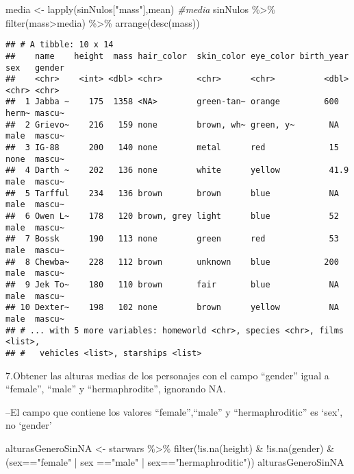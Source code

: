 \documentclass[
]{book}
\newenvironment{Shaded}{\begin{snugshade}}{\end{snugshade}}
\newcommand{\CommentTok}[1]{\textcolor[rgb]{0.56,0.35,0.01}{\textit{#1}}}
\newcommand{\FunctionTok}[1]{\textcolor[rgb]{0.00,0.00,0.00}{#1}}
\newcommand{\NormalTok}[1]{#1}
\newcommand{\OtherTok}[1]{\textcolor[rgb]{0.56,0.35,0.01}{#1}}
\newcommand{\SpecialCharTok}[1]{\textcolor[rgb]{0.00,0.00,0.00}{#1}}
\newcommand{\StringTok}[1]{\textcolor[rgb]{0.31,0.60,0.02}{#1}}
\begin{document}
\begin{Shaded}
\begin{Highlighting}[]
\NormalTok{media }\OtherTok{\textless{}{-}} \FunctionTok{lapply}\NormalTok{(sinNulos[}\StringTok{"mass"}\NormalTok{],mean)}
\CommentTok{\#media}
\NormalTok{sinNulos }\SpecialCharTok{\%\textgreater{}\%} \FunctionTok{filter}\NormalTok{(mass}\SpecialCharTok{\textgreater{}}\NormalTok{media) }\SpecialCharTok{\%\textgreater{}\%} \FunctionTok{arrange}\NormalTok{(}\FunctionTok{desc}\NormalTok{(mass))}
\end{Highlighting}
\end{Shaded}

\begin{verbatim}
## # A tibble: 10 x 14
##    name    height  mass hair_color  skin_color eye_color birth_year sex   gender
##    <chr>    <int> <dbl> <chr>       <chr>      <chr>          <dbl> <chr> <chr> 
##  1 Jabba ~    175  1358 <NA>        green-tan~ orange         600   herm~ mascu~
##  2 Grievo~    216   159 none        brown, wh~ green, y~       NA   male  mascu~
##  3 IG-88      200   140 none        metal      red             15   none  mascu~
##  4 Darth ~    202   136 none        white      yellow          41.9 male  mascu~
##  5 Tarfful    234   136 brown       brown      blue            NA   male  mascu~
##  6 Owen L~    178   120 brown, grey light      blue            52   male  mascu~
##  7 Bossk      190   113 none        green      red             53   male  mascu~
##  8 Chewba~    228   112 brown       unknown    blue           200   male  mascu~
##  9 Jek To~    180   110 brown       fair       blue            NA   male  mascu~
## 10 Dexter~    198   102 none        brown      yellow          NA   male  mascu~
## # ... with 5 more variables: homeworld <chr>, species <chr>, films <list>,
## #   vehicles <list>, starships <list>
\end{verbatim}

7.Obtener las alturas medias de los personajes con el campo ``gender'' igual a ``female'', ``male'' y ``hermaphrodite'', ignorando NA.

--El campo que contiene los valores ``female'',``male'' y ``hermaphroditic'' es `sex', no `gender'

\begin{Shaded}
\begin{Highlighting}[]
\NormalTok{alturasGeneroSinNA }\OtherTok{\textless{}{-}}\NormalTok{ starwars }\SpecialCharTok{\%\textgreater{}\%} \FunctionTok{filter}\NormalTok{(}\SpecialCharTok{!}\FunctionTok{is.na}\NormalTok{(height) }\SpecialCharTok{\&} \SpecialCharTok{!}\FunctionTok{is.na}\NormalTok{(gender) }\SpecialCharTok{\&}\NormalTok{ (sex}\SpecialCharTok{==}\StringTok{"female"} \SpecialCharTok{|}\NormalTok{ sex }\SpecialCharTok{==}\StringTok{"male"} \SpecialCharTok{|}\NormalTok{ sex}\SpecialCharTok{==}\StringTok{"hermaphroditic"}\NormalTok{))}
\NormalTok{alturasGeneroSinNA}
\end{Highlighting}
\end{Shaded}
\end{document}
